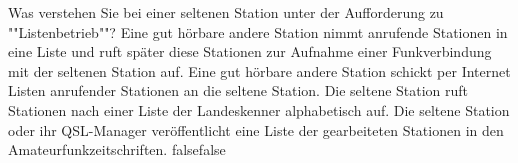     {Was verstehen Sie bei einer seltenen Station unter der Aufforderung zu ""Listenbetrieb""?}
    {Eine gut hörbare andere Station nimmt anrufende Stationen in eine Liste und ruft später diese Stationen zur Aufnahme einer Funkverbindung mit der seltenen Station auf.}
    {Eine gut hörbare andere Station schickt per Internet Listen anrufender Stationen an die seltene Station.}
    {Die seltene Station ruft Stationen nach einer Liste der Landeskenner alphabetisch auf.}
    {Die seltene Station oder ihr QSL-Manager veröffentlicht eine Liste der gearbeiteten Stationen in den Amateurfunkzeitschriften.}
    {false}{false}